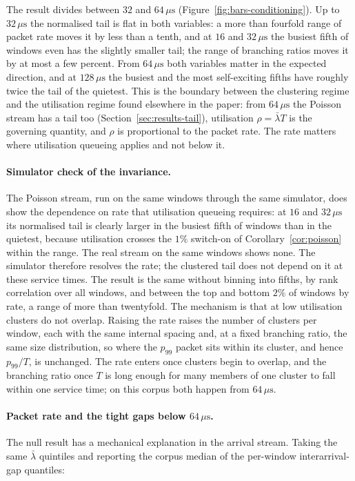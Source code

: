 \documentclass[11pt]{article}
\begin{document}
The result divides between $32$ and $64\,\mu\mathrm{s}$ (Figure~\ref{fig:bars-conditioning}).
Up to $32\,\mu\mathrm{s}$ the normalised tail is flat in both variables: a more than
fourfold range of packet rate moves it by less than a tenth, and at $16$ and
$32\,\mu\mathrm{s}$ the busiest fifth of windows even has the slightly smaller tail; the
range of branching ratios moves it by at most a few percent. From $64\,\mu\mathrm{s}$ both
variables matter in the expected direction, and at $128\,\mu\mathrm{s}$ the busiest and the
most self-exciting fifths have roughly twice the tail of the quietest. This is the
boundary between the clustering regime and the utilisation regime found elsewhere in the
paper: from $64\,\mu\mathrm{s}$ the Poisson stream has a tail too
(Section~\ref{sec:results-tail}), utilisation $\rho = \bar\lambda T$ is the governing
quantity, and $\rho$ is proportional to the packet rate. The rate matters where
utilisation queueing applies and not below it.

\paragraph{Simulator check of the invariance.} The Poisson stream, run on the same windows
through the same simulator, does show the dependence on rate that utilisation queueing
requires: at $16$ and $32\,\mu\mathrm{s}$ its normalised tail is clearly larger in the
busiest fifth of windows than in the quietest, because utilisation crosses the $1\%$
switch-on of Corollary~\ref{cor:poisson} within the range. The real stream on the same
windows shows none. The simulator therefore resolves the rate; the clustered tail does not
depend on it at these service times. The result is the same without binning into fifths,
by rank correlation over all windows, and between the top and bottom $2\%$ of windows by
rate, a range of more than twentyfold. The mechanism is that at low utilisation clusters do
not overlap. Raising the rate raises the number of clusters per window, each with the same
internal spacing and, at a fixed branching ratio, the same size distribution, so where the
$p_{99}$ packet sits within its cluster, and hence $p_{99}/T$, is unchanged. The rate
enters once clusters begin to overlap, and the branching ratio once $T$ is long enough for
many members of one cluster to fall within one service time; on this corpus both happen
from $64\,\mu\mathrm{s}$.

\paragraph{Packet rate and the tight gaps below $64\,\mu\mathrm{s}$.} The null result has a
mechanical explanation in the arrival stream. Taking the same $\bar\lambda$ quintiles and reporting the corpus median of
the per-window interarrival-gap quantiles:
\end{document}
